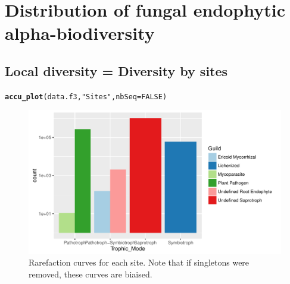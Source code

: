 \documentclass[12pt]{article}\usepackage[]{graphicx}\usepackage[]{color}
\makeatletter
\def\maxwidth{ %
  \ifdim\Gin@nat@width>\linewidth
    \linewidth
  \else
    \Gin@nat@width
  \fi
}
\newcommand{\hlnum}[1]{\textcolor[rgb]{0.686,0.059,0.569}{#1}}%
\newcommand{\hlstr}[1]{\textcolor[rgb]{0.192,0.494,0.8}{#1}}%
\newcommand{\hlstd}[1]{\textcolor[rgb]{0.345,0.345,0.345}{#1}}%
\newcommand{\hlkwc}[1]{\textcolor[rgb]{0.333,0.667,0.333}{#1}}%
\newcommand{\hlkwd}[1]{\textcolor[rgb]{0.737,0.353,0.396}{\textbf{#1}}}%
\newenvironment{kframe}{%
 \def\at@end@of@kframe{}%
 \ifinner\ifhmode%
  \def\at@end@of@kframe{\end{minipage}}%
  \begin{minipage}{\columnwidth}%
 \fi\fi%
 \def\FrameCommand##1{\hskip\@totalleftmargin \hskip-\fboxsep
 \colorbox{shadecolor}{##1}\hskip-\fboxsep
     \hskip-\linewidth \hskip-\@totalleftmargin \hskip\columnwidth}%
 \MakeFramed {\advance\hsize-\width
   \@totalleftmargin\z@ \linewidth\hsize
   \@setminipage}}%
 {\par\unskip\endMakeFramed%
 \at@end@of@kframe}
\newenvironment{knitrout}{}{} %
\numberwithin{figure}{section}
\makeatother
\begin{document}
\section{Distribution of fungal endophytic alpha-biodiversity}
  \subsection{Local diversity = Diversity by sites}

\begin{knitrout}\small
{}\color{fgcolor}\begin{kframe}
\begin{alltt}
\hlkwd{accu_plot}\hlstd{(data.f3,} \hlstr{"Sites"}\hlstd{,} \hlkwc{nbSeq} \hlstd{=} \hlnum{FALSE}\hlstd{)}
\end{alltt}
\end{kframe}\begin{figure}

{\centering \includegraphics[width=\maxwidth]{figure/unnamed-chunk-34-1} 

}

\caption[Rarefaction curves for each site]{Rarefaction curves for each site. Note that if singletons were removed, these curves are biaised.}\label{fig:unnamed-chunk-34}
\end{figure}


\end{knitrout}
\end{document}

